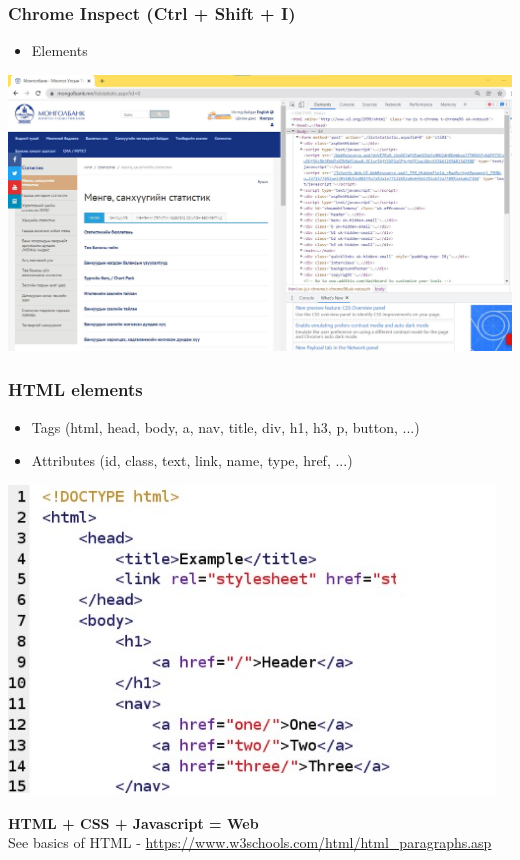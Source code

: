 \documentclass{beamer}
\begin{document}
\begin{frame}
    \frametitle{Chrome Inspect (Ctrl + Shift + I)}
        \begin{itemize}
            \item Elements
        \end{itemize}
\centering
\includegraphics[scale=0.25]{figures/bom.jpg}
\end{frame}

\begin{frame}
\frametitle{HTML elements}
    \begin{itemize}
        \item Tags (html, head, body, a, nav, title, div, h1, h3, p, button, ...)
        \item Attributes (id, class, text, link, name, type, href, ...)
    \end{itemize}
\centering
\includegraphics[scale=0.5]{figures/html.jpg}

\begin{flushleft}
    \textbf{HTML + CSS + Javascript = Web} \\
    See basics of HTML - \url{https://www.w3schools.com/html/html_paragraphs.asp}    
\end{flushleft}

\end{frame}
\end{document}
